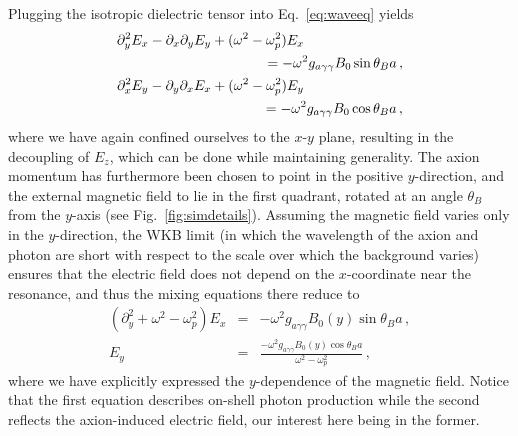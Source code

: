 \documentclass[twocolumn,superscriptaddress,floatfix,preprintnumbers,prd,nofootinbib,aps,10pt]{revtex4-2}
\renewcommand\({\left(}
\renewcommand\){\right)}
\renewcommand\[{\left[}
\renewcommand\]{\right]}
\begin{document}
Plugging the isotropic dielectric tensor into Eq.~\ref{eq:waveeq} yields
%
\begin{gather}
    \multlinegap=71pt
    \begin{multlined}
        \partial_y^2 E_x - \partial_x\partial_y E_y + (\omega^2 - \omega_p^2) E_x \\
        = - \omega^2 g_{a\gamma\gamma} B_0 \sin\theta_B a \, ,
    \end{multlined} \\
    \multlinegap=71pt
    \begin{multlined}
        \partial_x^2 E_y - \partial_y\partial_x E_x + (\omega^2 - \omega_p^2) E_y \\
        = - \omega^2 g_{a\gamma\gamma} B_0 \cos\theta_B a \, ,
    \end{multlined}
\end{gather}
%
where we have again confined ourselves to the $x$-$y$ plane, resulting in the decoupling of $E_z$, which can be done while maintaining generality. The axion momentum has furthermore been chosen to point in the positive $y$-direction, and the external magnetic field to lie in the first quadrant, rotated at an angle $\theta_B$ from the $y$-axis (see Fig.~\ref{fig:simdetails}). Assuming the magnetic field varies only in the $y$-direction, the WKB limit (in which the wavelength of the axion and photon are short with respect to the scale over which the background varies) ensures that the electric field does not depend on the $x$-coordinate near the resonance, and thus the mixing equations there reduce to
%
\begin{eqnarray}\label{eq:waveeq_isoplasma}
    (\partial_y^2 + \omega^2 - \omega_p^2) E_x &=& -\omega^2 g_{a\gamma\gamma} B_0(y) \sin \theta_B a \, , \\
    E_y &=& \frac{-\omega^2 g_{a\gamma\gamma} B_0(y) \cos\theta_B a}{\omega^2 - \omega_p^2} \, ,
\end{eqnarray}
%
where we have explicitly expressed the $y$-dependence of the magnetic field. Notice that the first equation describes on-shell photon production while the second reflects the axion-induced electric field, our interest here being in the former.
\end{document}
